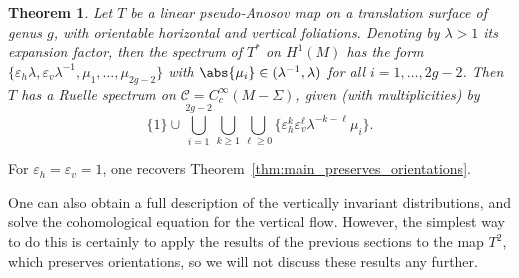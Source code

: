 \documentclass[JEP,XML,SOM,Unicode]{cedram}
\newcommand{\boC}{\mathcal{C}}
\let\epsilon\varepsilon
\newtheorem{thm}{Theorem}[section]
\theoremstyle{definition}
\numberwithin{equation}{section}
\begin{document}
\begin{thm}
\label{thm:orientable_not_preserved_foliations} Let $T$ be a linear
pseudo-Anosov map on a translation surface of genus $g$, with orientable
horizontal and vertical foliations. Denoting by $\lambda
> 1$ its expansion factor, then the spectrum of $T^*$ on $H^1(M)$ has the
form $\{\epsilon_h \lambda, \epsilon_v
\lambda^{-1},\mu_1,\dotsc,\mu_{2g-2}\}$ with $\abs{\mu_i} \in
(\lambda^{-1},\lambda)$ for all $i=1,\dotsc, 2g-2$. Then $T$ has a Ruelle
spectrum on $\boC = C^\infty_c(M-\Sigma)$, given (with multiplicities) by
\begin{equation*}
\{1\} \cup \bigcup_{i=1}^{2g-2} \bigcup_{k \geq 1} \bigcup_{\ell \geq 0} \{\epsilon_h^k \epsilon_v^\ell \lambda^{-k-\ell}\mu_i\}.
\end{equation*}
\end{thm}
For $\epsilon_h=\epsilon_v=1$, one recovers
Theorem~\ref{thm:main_preserves_orientations}.

One can also obtain a full description of the vertically invariant
distributions, and solve the cohomological equation for the vertical flow.
However, the simplest way to do this is certainly to apply the results of the
previous sections to the map $T^2$, which preserves orientations, so we will
not discuss these results any further.
\end{document}
